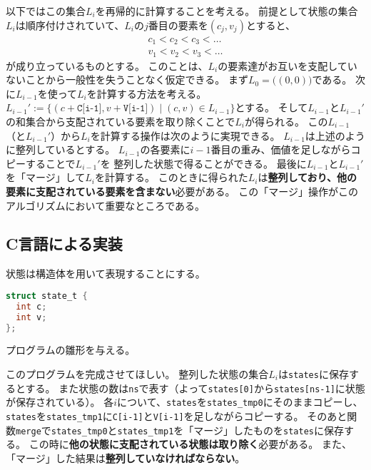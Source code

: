 \documentclass[a4paper,twoside,onecolumn,openany,article]{memoir}
\theoremstyle{remark}
\begin{document}
以下ではこの集合$L_i$を再帰的に計算することを考える。
前提として状態の集合$L_i$は順序付けされていて、$L_i$の$j$番目の要素を$(c_j, v_j)$とすると、
\begin{align*}
c_1< c_2< c_3< \dotsc\\
v_1< v_2< v_3< \dotsc
\end{align*}
が成り立っているものとする。
このことは、$L_i$の要素達がお互いを支配していないことから一般性を失うことなく仮定できる。
まず$L_0=\bigl((0,0)\bigr)$である。
次に$L_{i-1}$を使って$L_i$を計算する方法を考える。
$L_{i-1}':=\{(c+\texttt{C[i-1]}, v+\texttt{V[i-1]})\mid (c,v)\in L_{i-1}\}$とする。
そして$L_{i-1}$と$L_{i-1}'$の和集合から支配されている要素を取り除くことで$L_i$が得られる。
この$L_{i-1}$（と$L_{i-1}'$）から$L_i$を計算する操作は次のように実現できる。
$L_{i-1}$は上述のように整列しているとする。
$L_{i-1}$の各要素に$i-1$番目の重み、価値を足しながらコピーすることで$L_{i-1}'$を
整列した状態で得ることができる。
最後に$L_{i-1}$と$L_{i-1}'$を「マージ」して$L_i$を計算する。
このときに得られた$L_i$は\textbf{整列しており、他の要素に支配されている要素を含まない}必要がある。
この「マージ」操作がこのアルゴリズムにおいて重要なところである。

\subsection{C言語による実装}
状態は構造体を用いて表現することにする。
\begin{lstlisting}[basicstyle=\ttfamily\small,showstringspaces=false,language=C,frame=single]
struct state_t {
  int c;
  int v;
};
\end{lstlisting}
プログラムの雛形を与える。

このプログラムを完成させてほしい。
整列した状態の集合$L_i$は\texttt{states}に保存するとする。
また状態の数は\texttt{ns}で表す（よって\texttt{states[0]}から\texttt{states[ns-1]}に状態が保存されている）。
各$i$について、\texttt{states}を\texttt{states\_tmp0}にそのままコピーし、
\texttt{states}を\texttt{states\_tmp1}に\texttt{C[i-1]}と\texttt{V[i-1]}を足しながらコピーする。
そのあと関数\texttt{merge}で\texttt{states\_tmp0}と\texttt{states\_tmp1}を「マージ」したものを\texttt{states}に保存する。
この時に\textbf{他の状態に支配されている状態は取り除く}必要がある。
また、「マージ」した結果は\textbf{整列していなければならない}。
\end{document}
